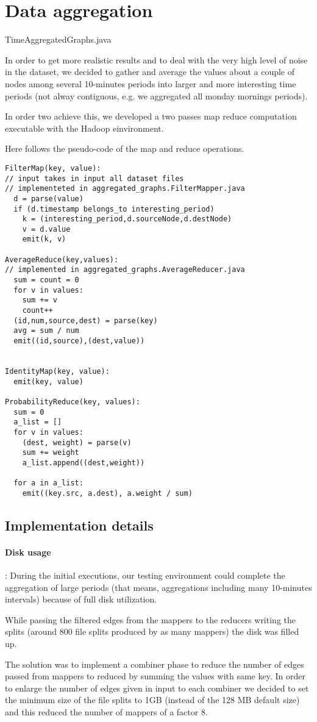 \section{Data aggregation}
\label{aggregation}

TimeAggregatedGraphs.java

In order to get more realistic results and to deal with 
the very high level of noise in the dataset,
we decided to gather and average the 
values about a couple of nodes among several 10-minutes periods
into larger and more interesting time periods 
(not alway contiguous, e.g. we aggregated all monday
mornings periods).

In order two achieve this, we developed a two passes map reduce computation executable with the Hadoop einvironment.

Here follows the pseudo-code of the map and reduce operations.

\begin{verbatim}
FilterMap(key, value):
// input takes in input all dataset files
// implementeted in aggregated_graphs.FilterMapper.java
  d = parse(value)
  if (d.timestamp belongs_to interesting_period)
  	k = (interesting_period,d.sourceNode,d.destNode)
  	v = d.value
    emit(k, v)

AverageReduce(key,values):
// implemented in aggregated_graphs.AverageReducer.java
  sum = count = 0
  for v in values:
  	sum += v
  	count++
  (id,num,source,dest) = parse(key)
  avg = sum / num
  emit((id,source),(dest,value))


IdentityMap(key, value):
  emit(key, value)

ProbabilityReduce(key, values):
  sum = 0
  a_list = []
  for v in values:
    (dest, weight) = parse(v)
    sum += weight
  	a_list.append((dest,weight))

  for a in a_list:
    emit((key.src, a.dest), a.weight / sum)
\end{verbatim}

\subsection{Implementation details}

\paragraph{Disk usage}: During the initial executions, our testing environment
could complete the aggregation of large periods (that means,
aggregations including many 10-minutes intervals) because of full
disk utilization.

While passing the filtered edges from the mappers to the reducers
writing the splits (around 800 file splits produced by
as many mappers) the disk was filled up.

The solution was to implement a combiner phase to reduce the number
of edges passed from mappers to reduced by summing the values
with same key. In order to enlarge the number of edges given in input
to each combiner we decided to set the minimum size of
the file splits to 1GB (instead of the 128 MB default size)
and this reduced the number of mappers of a factor 8.